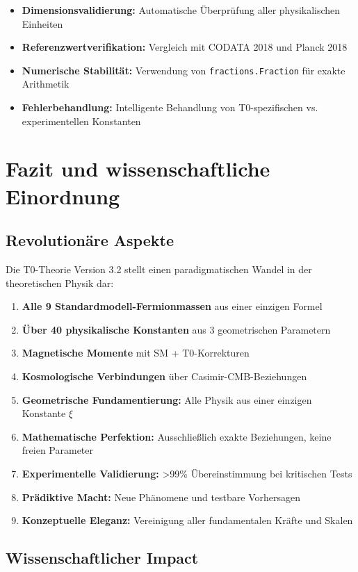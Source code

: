 \documentclass[11pt,a4paper]{article}
\begin{document}
	\begin{itemize}
		\item \textbf{Dimensionsvalidierung:} Automatische Überprüfung aller physikalischen Einheiten
		\item \textbf{Referenzwertverifikation:} Vergleich mit CODATA 2018 und Planck 2018
		\item \textbf{Numerische Stabilität:} Verwendung von \texttt{fractions.Fraction} für exakte Arithmetik
		\item \textbf{Fehlerbehandlung:} Intelligente Behandlung von T0-spezifischen vs. experimentellen Konstanten
	\end{itemize}
	
	\section{Fazit und wissenschaftliche Einordnung}
	
	\subsection{Revolutionäre Aspekte}
	
	Die T0-Theorie Version 3.2 stellt einen paradigmatischen Wandel in der theoretischen Physik dar:
	
	\begin{enumerate}
		\item \textbf{Alle 9 Standardmodell-Fermionmassen} aus einer einzigen Formel
		\item \textbf{Über 40 physikalische Konstanten} aus 3 geometrischen Parametern
		\item \textbf{Magnetische Momente} mit SM + T0-Korrekturen
		\item \textbf{Kosmologische Verbindungen} über Casimir-CMB-Beziehungen
		\item \textbf{Geometrische Fundamentierung:} Alle Physik aus einer einzigen Konstante $\xi$
		\item \textbf{Mathematische Perfektion:} Ausschließlich exakte Beziehungen, keine freien Parameter
		\item \textbf{Experimentelle Validierung:} >99\% Übereinstimmung bei kritischen Tests
		\item \textbf{Prädiktive Macht:} Neue Phänomene und testbare Vorhersagen
		\item \textbf{Konzeptuelle Eleganz:} Vereinigung aller fundamentalen Kräfte und Skalen
	\end{enumerate}
	
	\subsection{Wissenschaftlicher Impact}
	
\end{document}
